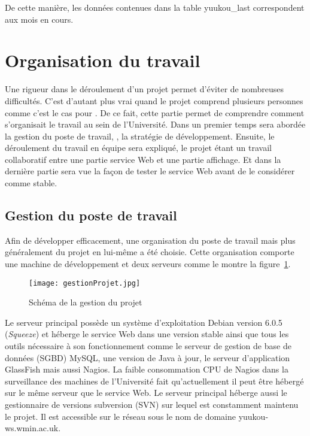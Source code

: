 De cette mani\`ere, les donn\'ees contenues dans la table \textsf{yuukou\_last} correspondent aux mois en cours.


\section{Organisation du travail}

Une rigueur dans le d\'eroulement d'un projet permet d'\'eviter de nombreuses difficult\'es.
C'est d'autant plus vrai quand le projet comprend plusieurs personnes comme c'est le cas pour {\YuukouII}.
De ce fait, cette partie permet de comprendre comment s'organisait le travail au sein de l'Universit\'e.
Dans un premier temps sera abord\'ee la gestion du poste de travail, \cad, la strat\'egie de d\'eveloppement.
Ensuite, le d\'eroulement du travail en \'equipe sera expliqu\'e, le projet \'etant un travail collaboratif entre une partie service Web et une partie affichage.
Et dans la derni\`ere partie sera vue la fa\c{c}on de tester le service Web avant de le consid\'erer comme stable.

\subsection{Gestion du poste de travail}
\label{section:gestionProjet}

Afin de d\'evelopper efficacement, une organisation du poste de travail mais plus g\'en\'eralement du projet en lui-m\^eme a \'et\'e choisie.
Cette organisation comporte une machine de d\'eveloppement et deux serveurs comme le montre la figure~\ref{figure:gestionProjet}.

\begin{figure}[!ht]
	\centering
	\texttt{[image: gestionProjet.jpg]}
	\caption{Sch\'ema de la gestion du projet}
	\label{figure:gestionProjet}

\end{figure}

Le serveur principal poss\`ede un syst\`eme d'exploitation Debian version 6.0.5 (\textit{Squeeze}) et h\'eberge le service Web dans une version stable ainsi que tous les outils n\'ecessaire \`a son fonctionnement comme le serveur de gestion de base de donn\'ees (SGBD) MySQL, une version de Java \`a jour, le serveur d'application GlassFish mais aussi Nagios.
La faible consommation CPU de Nagios dans la surveillance des machines de l'Universit\'e fait qu'actuellement il peut \^etre h\'eberg\'e sur le m\^eme serveur que le service Web.
Le serveur principal h\'eberge aussi le gestionnaire de versions subversion (SVN) sur lequel est constamment maintenu le projet.
Il est accessible sur le r\'eseau sous le nom de domaine \textsf{yuukou-ws.wmin.ac.uk}.

